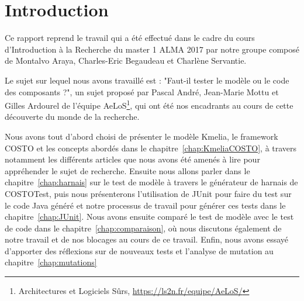\vspace*{\fill}
\chapter*{Introduction}
\label{chap:introduction}
Ce rapport reprend le travail qui a été effectué dans le cadre du cours d'Introduction à la Recherche du master 1 ALMA 2017 par notre groupe composé de Montalvo Araya, Charles-Eric Begaudeau et Charlène Servantie.


Le sujet sur lequel nous avons travaillé est : "Faut-il tester le modèle ou le code des composants ?", un sujet proposé par Pascal André, Jean-Marie Mottu et Gilles Ardourel de l'équipe AeLoS\footnote{Architectures et Logiciels Sûrs, \url{https://ls2n.fr/equipe/AeLoS/}}, qui ont été nos encadrants au cours de cette découverte du monde de la recherche.

Nous avons tout d'abord choisi de présenter le modèle Kmelia, le framework COSTO et les concepts abordés dans le chapitre~\ref{chap:KmeliaCOSTO}, à travers notamment les différents articles que nous avons été amenés à lire pour appréhender le sujet de recherche. Ensuite nous allons parler dans le chapitre~\ref{chap:harnais} sur le test de modèle à travers le générateur de harnais de COSTOTest, puis nous présenterons l'utilisation de JUnit pour faire du test sur le code Java généré et notre processus de travail pour générer ces tests dans le chapitre~\ref{chap:JUnit}. Nous avons ensuite comparé le test de modèle avec le test de code dans le chapitre~\ref{chap:comparaison}, où nous discutons également de notre travail et de nos blocages au cours de ce travail. Enfin, nous avons essayé d'apporter des réflexions sur de nouveaux tests et l'analyse de mutation au chapitre~\ref{chap:mutations}

 

\vspace*{\fill}